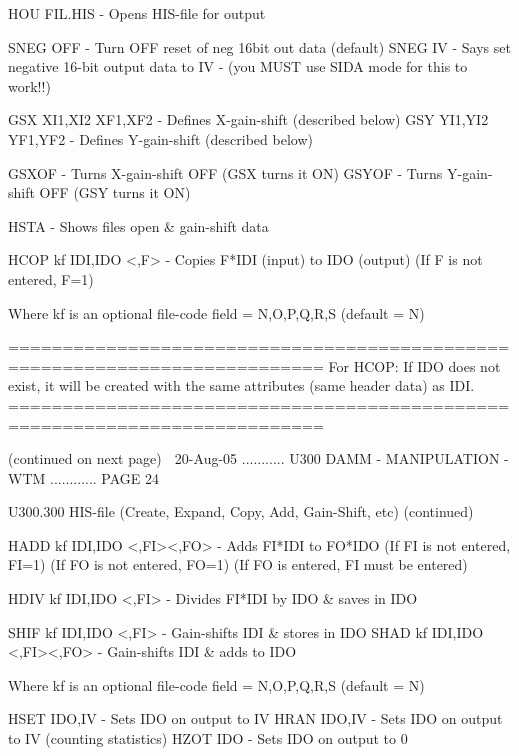    HOU  FIL.HIS               - Opens HIS-file for output
 
   SNEG OFF                   - Turn OFF reset of neg 16bit out data (default)
   SNEG IV                    - Says set negative 16-bit output data to IV
                              - (you MUST use SIDA mode for this to work!!)
 
   GSX  XI1,XI2 XF1,XF2       - Defines   X-gain-shift (described below)
   GSY  YI1,YI2 YF1,YF2       - Defines   Y-gain-shift (described below)
 
   GSXOF                      - Turns X-gain-shift OFF (GSX turns it ON)
   GSYOF                      - Turns Y-gain-shift OFF (GSY turns it ON)
 
   HSTA                       - Shows files open & gain-shift data
 
   HCOP kf IDI,IDO <,F>       - Copies F*IDI (input) to IDO (output)
                                (If F is not entered, F=1)
 
   Where kf is an optional file-code field = N,O,P,Q,R,S (default = N)
 
   ===========================================================================
   For HCOP: If IDO does not exist, it will be created with the same
   attributes (same header data) as IDI.
   ===========================================================================
 
                            (continued on next page)
    
   20-Aug-05 ........... U300  DAMM - MANIPULATION - WTM ............ PAGE  24
 
 
 
   U300.300  HIS-file (Create, Expand, Copy, Add, Gain-Shift, etc) (continued)
 
   HADD kf IDI,IDO <,FI><,FO> - Adds FI*IDI to FO*IDO
                                (If FI is not entered, FI=1)
                                (If FO is not entered, FO=1)
                                (If FO is entered, FI must be entered)
 
   HDIV kf IDI,IDO <,FI>      - Divides FI*IDI by IDO & saves in IDO
 
   SHIF kf IDI,IDO <,FI>      - Gain-shifts IDI & stores in IDO
   SHAD kf IDI,IDO <,FI><,FO> - Gain-shifts IDI & adds   to IDO
 
   Where kf is an optional file-code field = N,O,P,Q,R,S (default = N)
 
   HSET IDO,IV                - Sets IDO on output to IV
   HRAN IDO,IV                - Sets IDO on output to IV (counting statistics)
   HZOT IDO                   - Sets IDO on output to 0
 
